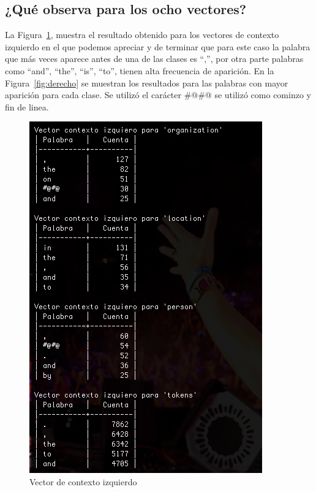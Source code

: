 \documentclass{article}
\begin{document}
\subsection{¿Qué observa para los ocho vectores?}
La Figura~\ref{fig:izquierdo}, muestra el resultado obtenido para los vectores de contexto izquierdo en el que podemos apreciar y de terminar que para este caso la palabra que más veces aparece antes de una de las clases es ``,'', por otra parte palabras como ``and'', ``the'', ``is'', ``to'', tienen alta frecuencia de aparición. En la Figura~\ref{fig:derecho} se muestran los resultados para las palabras con mayor aparición para cada clase. Se utilizó el carácter \#\makeatletter @\#\makeatletter @ se utilizó como cominzo y fin de linea.
\begin{figure}[h!]
\centering
\includegraphics[scale=0.5]{figuras/izquierdo.png}
\caption{Vector de contexto izquierdo}
\label{fig:izquierdo}
\end{figure}
\end{document}
